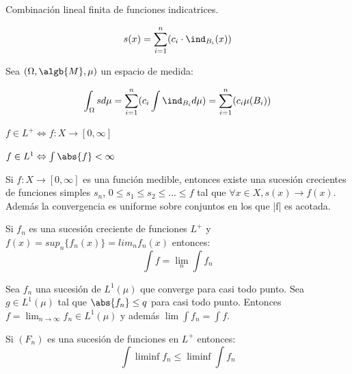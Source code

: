 \documentclass{apuntes}
\begin{document}
\begin{defn}
Combinación lineal finita de funciones indicatrices.

\[
s(x) = \sum_{i=1}^{n}(c_i \cdot \ind_{B_i}(x))
\]
\end{defn}

\begin{defn}
Sea $(\Omega,\algb{M},\mu)$ un espacio de medida:

\[\int_{\Omega} sd\mu = \sum_{i=1}^{n}(c_i \int \ind_{B_i} d\mu) = \sum_{i=1}^{n}(c_i \mu(B_i))\]
\end{defn}

\begin{defn}[Función $L^+$]
$f \in L^+ \Leftrightarrow f:X\rightarrow [0, \infty]$
\end{defn}

\begin{defn}[Función $L^1$]
$f \in L^1 \Leftrightarrow \int \abs{f} < \infty $
\end{defn}

\begin{defn}
Si $f:X \rightarrow [0, \infty]$ es una función medible, entonces existe una sucesión crecientes de funciones simples $s_n$, $0 \leq s_1 \leq s_2 \leq ... \leq f$ tal que $\forall x  \in X, s(x) \rightarrow f(x)$. Además la convergencia es uniforme sobre conjuntos en los que |f| es acotada.
\end{defn}

\begin{defn}
Si $f_n$ es una sucesión creciente de funciones $L^+$ y $f(x)=sup_n\{f_n(x)\}=lim_nf_n(x)$ entonces:
\[
\int f = \lim_n \int f_n
\]
\end{defn}

\begin{defn}
Sea $f_n$ una sucesión de $L^1(\mu)$ que converge para casi todo punto. Sea $g \in L^1(\mu)$ tal que $\abs{f_n} \leq q$ para casi todo punto. Entonces $f=\lim_{n \rightarrow \infty} f_n \in L^1(\mu)$ y además $\lim \int f_n = \int f$. 
\end{defn}

\begin{defn}
Si $(F_n)$ es una sucesión de funciones en $L^+$ entonces:
\[
\int \liminf f_n \leq \liminf \int f_n 
\]
\end{defn}
\end{document}
